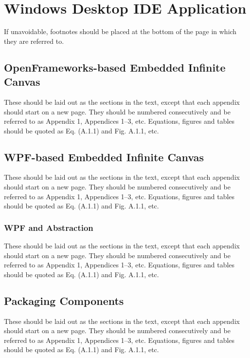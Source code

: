 \documentclass[aps,prb,twocolumn,superscriptaddress,floatfix,longbibliography]{revtex4-2}
\begin{document}
\section{Windows Desktop IDE Application}

If unavoidable, footnotes should be placed at the bottom
of the page in which they are referred to.

\subsection{OpenFrameworks-based Embedded Infinite Canvas}

These should be laid out as the sections in the text,
except that each appendix should start on a new page.
They should be numbered consecutively and be referred
to as Appendix 1, Appendices 1--3, etc. 
Equations, figures and tables should be
quoted as Eq. (A.1.1) and Fig. A.1.1, etc.  

\subsection{WPF-based Embedded Infinite Canvas}

These should be laid out as the sections in the text,
except that each appendix should start on a new page.
They should be numbered consecutively and be referred
to as Appendix 1, Appendices 1--3, etc. 
Equations, figures and tables should be
quoted as Eq. (A.1.1) and Fig. A.1.1, etc.  

\subsubsection{WPF and Abstraction}

These should be laid out as the sections in the text,
except that each appendix should start on a new page.
They should be numbered consecutively and be referred
to as Appendix 1, Appendices 1--3, etc. 
Equations, figures and tables should be
quoted as Eq. (A.1.1) and Fig. A.1.1, etc.  

\subsection{Packaging Components}

These should be laid out as the sections in the text,
except that each appendix should start on a new page.
They should be numbered consecutively and be referred
to as Appendix 1, Appendices 1--3, etc. 
Equations, figures and tables should be
quoted as Eq. (A.1.1) and Fig. A.1.1, etc.  
\end{document}

